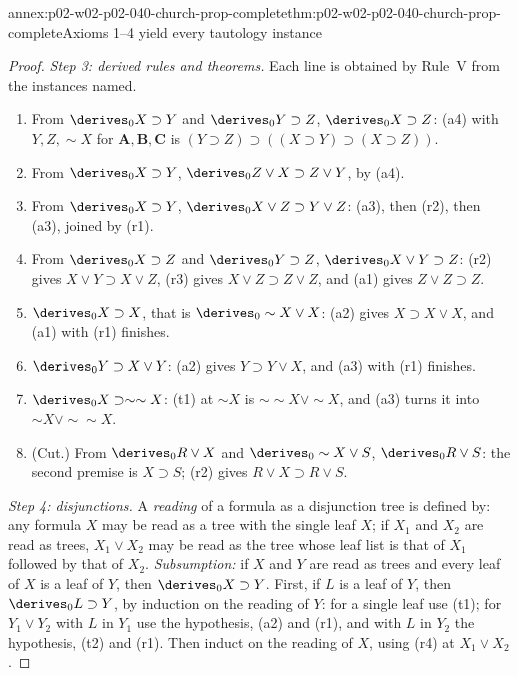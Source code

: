 \begin{annexitem}{annex:p02-w02-p02-040-church-prop-complete}{thm:p02-w02-p02-040-church-prop-complete}{Axioms 1--4 yield every tautology instance}
\begin{proof}
\emph{Step 3: derived rules and theorems.}  Each line is obtained by Rule~V
from the instances named.
\begin{enumerate}
 \item[(r1)] From \(\derives_0X\supset Y\) and \(\derives_0Y\supset Z\),
   \(\derives_0X\supset Z\): (a4) with \(Y,Z,\sim X\) for \(\mathbf A,\mathbf B,\mathbf C\)
   is \((Y\supset Z)\supset((X\supset Y)\supset(X\supset Z))\).
 \item[(r2)] From \(\derives_0X\supset Y\), \(\derives_0Z\vee X\supset Z\vee Y\), by (a4).
 \item[(r3)] From \(\derives_0X\supset Y\), \(\derives_0X\vee Z\supset Y\vee Z\):
   (a3), then (r2), then (a3), joined by (r1).
 \item[(r4)] From \(\derives_0X\supset Z\) and \(\derives_0Y\supset Z\),
   \(\derives_0X\vee Y\supset Z\): (r2) gives \(X\vee Y\supset X\vee Z\), (r3)
   gives \(X\vee Z\supset Z\vee Z\), and (a1) gives \(Z\vee Z\supset Z\).
 \item[(t1)] \(\derives_0X\supset X\), that is \(\derives_0\sim X\vee X\): (a2)
   gives \(X\supset X\vee X\), and (a1) with (r1) finishes.
 \item[(t2)] \(\derives_0Y\supset X\vee Y\): (a2) gives \(Y\supset Y\vee X\), and
   (a3) with (r1) finishes.
 \item[(t3)] \(\derives_0X\supset\sim\sim X\): (t1) at \(\sim X\) is
   \(\sim\sim X\vee\sim X\), and (a3) turns it into \(\sim X\vee\sim\sim X\).
 \item[(r5)] (Cut.)  From \(\derives_0R\vee X\) and \(\derives_0\sim X\vee S\),
   \(\derives_0R\vee S\): the second premise is \(X\supset S\); (r2) gives
   \(R\vee X\supset R\vee S\).
\end{enumerate}

\emph{Step 4: disjunctions.}  A \emph{reading} of a formula as a disjunction
tree is defined by: any formula \(X\) may be read as a tree with the single
leaf \(X\); if \(X_1\) and \(X_2\) are read as trees, \(X_1\vee X_2\) may be
read as the tree whose leaf list is that of \(X_1\) followed by that of
\(X_2\).  \emph{Subsumption:} if \(X\) and \(Y\) are read as trees and every
leaf of \(X\) is a leaf of \(Y\), then \(\derives_0X\supset Y\).  First, if
\(L\) is a leaf of \(Y\), then \(\derives_0L\supset Y\), by induction on the
reading of \(Y\): for a single leaf use (t1); for \(Y_1\vee Y_2\) with \(L\)
in \(Y_1\) use the hypothesis, (a2) and (r1), and with \(L\) in \(Y_2\) the
hypothesis, (t2) and (r1).  Then induct on the reading of \(X\), using (r4)
at \(X_1\vee X_2\).


\end{proof}
\end{annexitem}
